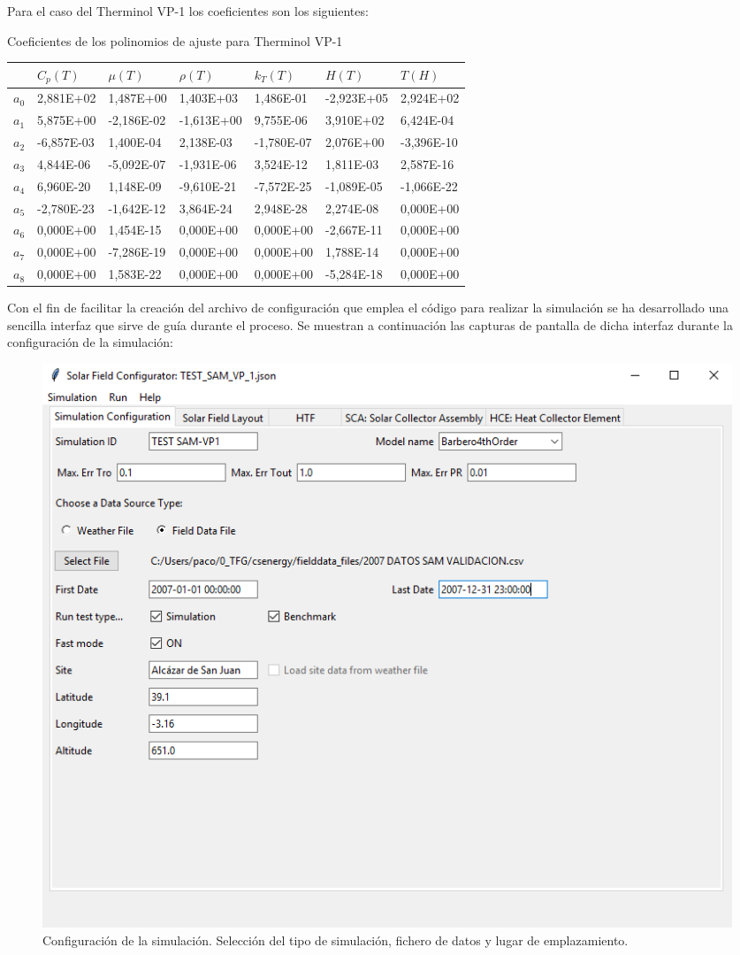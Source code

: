 Para el caso del Therminol VP-1 los coeficientes son los siguientes:

Coeficientes de los polinomios de ajuste para Therminol VP-1

\begin{longtable}[]{@{}lllllll@{}}

& \(C_p(T)\) & \(\mu(T)\) & \(\rho(T)\) & \(k_T(T)\) & \(H(T)\) &
\(T(H)\)\tabularnewline

\endhead
\(a_0\) & 2,881E+02 & 1,487E+00 & 1,403E+03 & 1,486E-01 & -2,923E+05 &
2,924E+02\tabularnewline
\(a_1\) & 5,875E+00 & -2,186E-02 & -1,613E+00 & 9,755E-06 & 3,910E+02 &
6,424E-04\tabularnewline
\(a_2\) & -6,857E-03 & 1,400E-04 & 2,138E-03 & -1,780E-07 & 2,076E+00 &
-3,396E-10\tabularnewline
\(a_3\) & 4,844E-06 & -5,092E-07 & -1,931E-06 & 3,524E-12 & 1,811E-03 &
2,587E-16\tabularnewline
\(a_4\) & 6,960E-20 & 1,148E-09 & -9,610E-21 & -7,572E-25 & -1,089E-05 &
-1,066E-22\tabularnewline
\(a_5\) & -2,780E-23 & -1,642E-12 & 3,864E-24 & 2,948E-28 & 2,274E-08 &
0,000E+00\tabularnewline
\(a_6\) & 0,000E+00 & 1,454E-15 & 0,000E+00 & 0,000E+00 & -2,667E-11 &
0,000E+00\tabularnewline
\(a_7\) & 0,000E+00 & -7,286E-19 & 0,000E+00 & 0,000E+00 & 1,788E-14 &
0,000E+00\tabularnewline
\(a_8\) & 0,000E+00 & 1,583E-22 & 0,000E+00 & 0,000E+00 & -5,284E-18 &
0,000E+00\tabularnewline

\end{longtable}

Con el fin de facilitar la creación del archivo de configuración que emplea el código para realizar la simulación se ha desarrollado una sencilla interfaz que sirve de guía durante el proceso. Se muestran a continuación las capturas de pantalla de dicha interfaz durante la configuración de la simulación: 

\begin{figure}
\includegraphics[scale=0.8]{images/interface01.png}
\caption{Configuración de la simulación. Selección del tipo de simulación, fichero de datos y lugar de emplazamiento.} 
\label{fig:interface01}
\end{figure}

